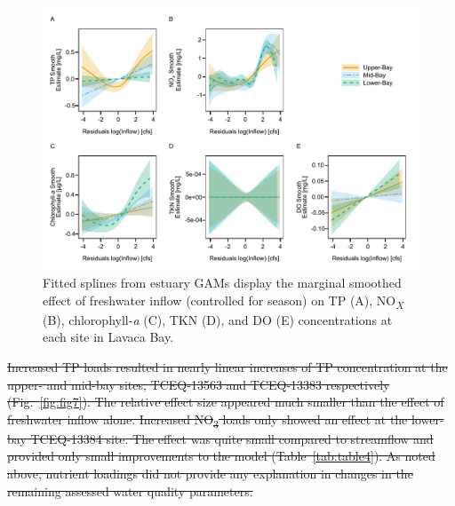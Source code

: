 \documentclass[fleqn,10pt,lineno]{wlpeerj} %
\providecommand{\DIFdeltex}[1]{{\protect\color{red}\sout{#1}}}                      %
\providecommand{\DIFdelbegin}{} %
\providecommand{\DIFdelend}{} %
\providecommand{\DIFaddbeginFL}{} %
\providecommand{\DIFaddendFL}{} %
\providecommand{\DIFdelbeginFL}{} %
\providecommand{\DIFdelendFL}{} %
\providecommand{\DIFdel}[1]{\texorpdfstring{\DIFdeltex{#1}}{}} %
\begin{document}
\DIFdelend \begin{figure}

{\centering \DIFdelbeginFL %
\DIFdelendFL \DIFaddbeginFL \includegraphics[width=1\linewidth,]{Schramm-2023-08-PeerJ_files/figure-latex/fig6} 
\DIFaddendFL 

}

\caption{Fitted splines from estuary GAMs display the marginal smoothed effect of freshwater inflow (controlled for season) on TP (A), NO\textit{\textsubscript{X}} (B), chlorophyll-\textit{a} (C), TKN (D), and DO (E) concentrations at each site in Lavaca Bay.}\label{fig:fig6}
\end{figure}

\DIFdelbegin \DIFdel{Increased TP loads resulted in nearly linear increases of TP
concentration at the upper- and mid-bay sites, TCEQ-13563 and TCEQ-13383
respectively (Fig.~\ref{fig:fig7}). The relative effect size appeared
much smaller than the effect of freshwater inflow alone. Increased
NO\textsubscript{3} loads only showed an effect at the lower-bay
TCEQ-13384 site. The effect was quite small compared to streamflow and
provided only small improvements to the model (Table~\ref{tab:table4}).
As noted above, nutrient loadings did not provide any explanation in
changes in the remaining assessed water quality parameters.
}%
\end{document}
